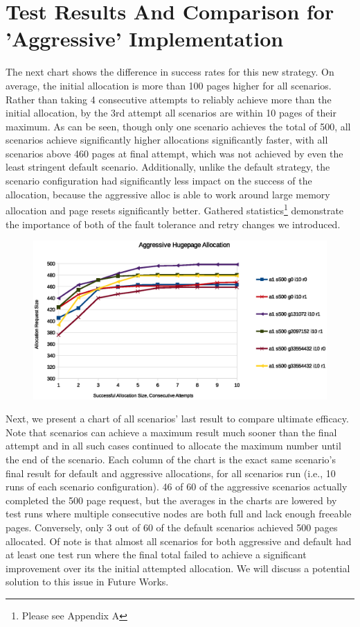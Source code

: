\documentclass{article}
\begin{document}
\section{Test Results And Comparison for 'Aggressive' Implementation}
The next chart shows the difference in success rates for this new strategy. On average, the initial allocation is more than 100 pages higher for all scenarios. Rather than taking 4 consecutive attempts to reliably achieve more than the initial allocation, by the 3rd attempt all scenarios are within 10 pages of their maximum. As can be seen, though only one scenario achieves the total of 500, all scenarios achieve significantly higher allocations significantly faster, with all scenarios above 460 pages at final attempt, which was not achieved by even the least stringent default scenario. Additionally, unlike the default strategy, the scenario configuration had significantly less impact on the success of the allocation, because the aggressive alloc is able to work around large memory allocation and page resets significantly better.  Gathered statistics\footnote{Please see Appendix A} demonstrate the importance of both of the fault tolerance and retry changes we introduced.

\begin{figure}[H]
	\includegraphics[width=\linewidth]{./datums/aggressive_alloc.eps}
	\label{fig:aggressive_alloc}
\end{figure}

Next, we present a chart of all scenarios' last result to compare ultimate efficacy. Note that scenarios can achieve a maximum result much sooner than the final attempt and in all such cases continued to allocate the maximum number until the end of the scenario. Each column of the chart is the exact same scenario's final result for default and aggressive allocations, for all scenarios run (i.e., 10 runs of each scenario configuration). 46 of 60 of the aggressive scenarios actually completed the 500 page request, but the averages in the charts are lowered by test runs where multiple consecutive nodes are both full and lack enough freeable pages. Conversely, only 3 out of 60 of the default scenarios achieved 500 pages allocated. Of note is that almost all scenarios for both aggressive and default had at least one test run where the final total failed to achieve a significant improvement over its the initial attempted allocation. We will discuss a potential solution to this issue in Future Works.
\end{document}
